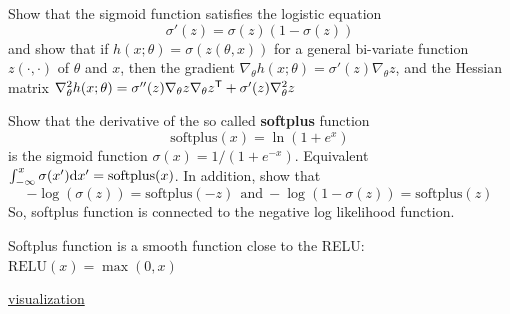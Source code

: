 \documentclass[english,handout]{beamer}
\begin{document}
 
 
 
\frame
 {
 
 \begin{ex}
Show that the sigmoid function satisfies  the logistic equation
\[
 {\sigma'(z) =\sigma(z)(1-\sigma(z))}
\]
and show that if $h(x;\theta)=\sigma(z(\theta,x))$
for a general bi-variate function $z(\cdot,\cdot)$ of $\theta$ and $x$, then 
the gradient 
$\nabla_\theta h(x;\theta)=\sigma'(z)\nabla_\theta z $,
and the Hessian matrix
$
\nabla^2_\theta h(x;\theta) = \sigma''(z) \nabla_\theta z \nabla_\theta z^{\textsf{T}} 
+\sigma'(z) \nabla^2_\theta z
$ 
\end{ex}


\begin{ex}
Show that the derivative of the so called
{\bf softplus} function 
\[
\mbox{softplus}(x) = \ln (1+e^x) 
\]
is 
the sigmoid function $\sigma(x)=1/(1+e^{-x})$.
Equivalent
$\int_{-\infty}^x \sigma(x')\mathrm{d} x' = \mbox{softplus}(x) $.
In addition, show that 
$$-\log ( \sigma(z)) = \mbox{softplus}(-z)
~~\mbox{and} ~ 
-\log (1- \sigma(z)) = \mbox{softplus}(z)$$
So, softplus function is connected to the 
negative log likelihood function.
\end{ex}
Softplus function is 
a smooth function close to 
the RELU: $\mbox{RELU}(x)= \max(0,x)$

\href{https://www.desmos.com/calculator/4ophg8wvju}
{visualization}
}
\end{document}
